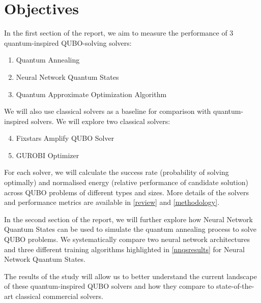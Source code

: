 \section{Objectives}
In the first section of the report, we aim to measure the performance of 3 quantum-inspired QUBO-solving solvers:
\begin{enumerate}
    \item Quantum Annealing
    \item Neural Network Quantum States
    \item Quantum Approximate Optimization Algorithm
\end{enumerate}
We will also use classical solvers as a baseline for comparison with quantum-inspired solvers. We will explore two classical solvers:
\begin{enumerate}
    \setcounter{enumi}{3}
    \item Fixstars Amplify QUBO Solver
    \item GUROBI Optimizer
\end{enumerate}



For each solver, we will calculate the success rate (probability of solving optimally) and normalised energy (relative performance of candidate solution) across QUBO problems of different types and sizes. More details of the solvers and performance metrics are available in \autoref{review} and \autoref{methodology}.

In the second section of the report, we will further explore how Neural Network Quantum States can be used to simulate the quantum annealing process to solve QUBO problems. We systematically compare two neural network architectures and three different training algorithms highlighted in \autoref{nnqsresults} for Neural Network Quantum States.

The results of the study will allow us to better understand the current landscape of these quantum-inspired QUBO solvers and how they compare to state-of-the-art classical commercial solvers.